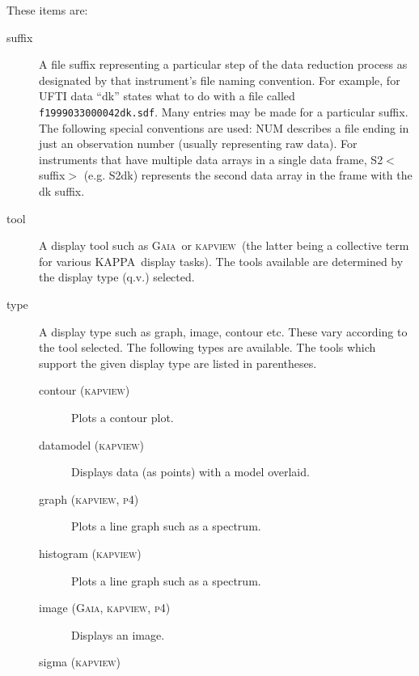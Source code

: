 \documentclass[twoside,11pt]{article}
\newcommand{\xref}[3]{#1}
\renewcommand{\_}{\texttt{\symbol{95}}}
\newcommand{\KAPPA}{\xref{{\textsc{KAPPA}}}{sun95}{}}
\newcommand{\kapview}{\textsc{kapview}}
\newcommand{\gaia}{\xref{{\textsc{Gaia}}}{sun214}{}}
\begin{document}
These items are:

\begin{description}
\item[suffix] \mbox{}

A file suffix representing a particular step of the data reduction
process as designated by that instrument's file naming convention. For
example, for UFTI data ``dk'' states what to do with a file called
 \texttt{f19990330\_00042\_dk.sdf}. Many entries may be made for a particular
suffix. The following special conventions are used: NUM describes a
file ending in just an observation number (usually representing raw
data). For instruments that have multiple data arrays in a single data
frame, S2$<$suffix$>$ (e.g. S2dk) represents the second data array in the
frame with the \_dk suffix.

\item[tool] \mbox{}

A display tool such as \gaia\ or \kapview\ (the latter being a collective
term for various \KAPPA\ display tasks). The tools available are
determined by the display type (q.v.) selected.

\item[type] \mbox{}

A display type such as graph, image, contour etc. These vary according 
to the tool selected.   The following types are available.  The tools
which support the given display type are listed in parentheses.

\begin{description}
\item[contour (\kapview)] \mbox{}

Plots a contour plot.

\item[datamodel (\kapview)] \mbox{}

Displays data (as points) with a model overlaid.

\item[graph (\kapview, \textsc{p4})] \mbox{}

Plots a line graph such as a spectrum.

\item[histogram (\kapview)] \mbox{}

Plots a line graph such as a spectrum.

\item[image (\gaia, \kapview, \textsc{p4})] \mbox{}

Displays an image.

\item[sigma (\kapview)] \mbox{}


\end{description}
\end{description}
\end{document}
